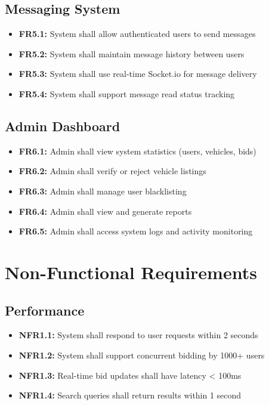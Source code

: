 \documentclass[12pt,a4paper]{report}
\begin{document}
\subsection{Messaging System}
\begin{itemize}
    \item \textbf{FR5.1:} System shall allow authenticated users to send messages
    \item \textbf{FR5.2:} System shall maintain message history between users
    \item \textbf{FR5.3:} System shall use real-time Socket.io for message delivery
    \item \textbf{FR5.4:} System shall support message read status tracking
\end{itemize}

\subsection{Admin Dashboard}
\begin{itemize}
    \item \textbf{FR6.1:} Admin shall view system statistics (users, vehicles, bids)
    \item \textbf{FR6.2:} Admin shall verify or reject vehicle listings
    \item \textbf{FR6.3:} Admin shall manage user blacklisting
    \item \textbf{FR6.4:} Admin shall view and generate reports
    \item \textbf{FR6.5:} Admin shall access system logs and activity monitoring
\end{itemize}

\section{Non-Functional Requirements}

\subsection{Performance}
\begin{itemize}
    \item \textbf{NFR1.1:} System shall respond to user requests within 2 seconds
    \item \textbf{NFR1.2:} System shall support concurrent bidding by 1000+ users
    \item \textbf{NFR1.3:} Real-time bid updates shall have latency < 100ms
    \item \textbf{NFR1.4:} Search queries shall return results within 1 second
\end{itemize}
\end{document}
